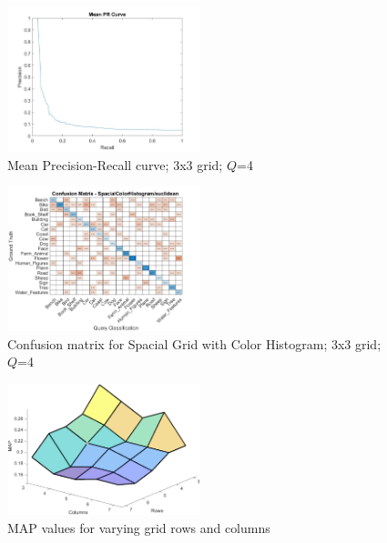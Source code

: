 \begin{figure}[htbp]
  \begin{center}
    \includegraphics[width=0.5\textwidth]{./assets/plots/Spacial_Grid_Color_Histogram/mean_pr_graph_3x3_4q.jpg}
    \caption{Mean Precision-Recall curve; 3x3 grid; $Q$=4}
    \label{fig:sgch_mean_pr_graph_q4}
  \end{center}
\end{figure}

\begin{figure}[htbp]
  \begin{center}
    \includegraphics[width=0.5\textwidth]{./assets/plots/Spacial_Grid_Color_Histogram/confusion_matrix.jpg}
    \caption{Confusion matrix for Spacial Grid with Color Histogram; 3x3 grid; $Q$=4}
    \label{fig:sgch_confmat}
  \end{center}
\end{figure}

\begin{figure}[htbp]
  \begin{center}
    \includegraphics[width=0.5\textwidth]{./assets/plots/Spacial_Grid_Color_Histogram/map_varying_grid.png}
    \caption{MAP values for varying grid rows and columns}
    \label{fig:sgch_varyingmap}
  \end{center}
\end{figure}

